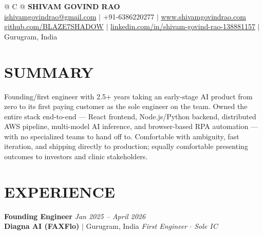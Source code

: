 \documentclass[a4paper,10pt]{article}
\begin{document}
\pagestyle{empty}

\begin{tabularx}{\linewidth}{@{} C @{}}
\Huge{\textbf{SHIVAM GOVIND RAO}} \\[6pt]
\normalsize{\href{mailto:ishivamgovindrao@gmail.com}{ishivamgovindrao@gmail.com} $|$ +91-6386220277 $|$ \href{https://www.shivamgovindrao.com}{www.shivamgovindrao.com}} \\
\normalsize{\href{https://github.com/BLAZE7SHADOW}{github.com/BLAZE7SHADOW} $|$ \href{https://www.linkedin.com/in/shivam-govind-rao-138881157/}{linkedin.com/in/shivam-govind-rao-138881157} $|$ Gurugram, India}
\end{tabularx}

\vspace{3pt}

\section{SUMMARY}

Founding/first engineer with 2.5+ years taking an early-stage AI product from zero to its first paying customer as the sole engineer on the team. Owned the entire stack end-to-end --- React frontend, Node.js/Python backend, distributed AWS pipeline, multi-model AI inference, and browser-based RPA automation --- with no specialized teams to hand off to. Comfortable with ambiguity, fast iteration, and shipping directly to production; equally comfortable presenting outcomes to investors and clinic stakeholders.

\section{EXPERIENCE}

\textbf{Founding Engineer} \hfill \textit{Jan 2025 -- April 2026}\\
\textbf{Diagna AI (FAXFlo)} $|$ Gurugram, India \hfill \textit{First Engineer $\cdot$ Sole IC}
\end{document}
